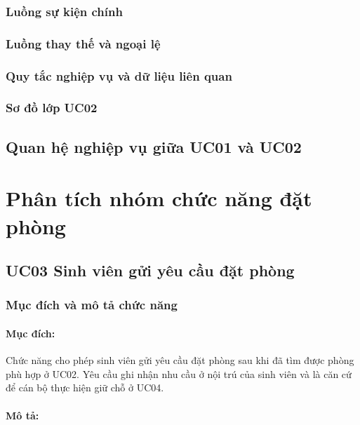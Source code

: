 \subsubsection{Luồng sự kiện chính}


\subsubsection{Luồng thay thế và ngoại lệ}


\subsubsection{Quy tắc nghiệp vụ và dữ liệu liên quan}


\subsubsection{Sơ đồ lớp UC02}


\subsection{Quan hệ nghiệp vụ giữa UC01 và UC02}


\section{Phân tích nhóm chức năng đặt phòng}

\subsection{UC03 Sinh viên gửi yêu cầu đặt phòng}

\subsubsection{Mục đích và mô tả chức năng}

\paragraph{Mục đích:}

Chức năng cho phép sinh viên gửi yêu cầu đặt phòng sau khi đã tìm được phòng phù hợp ở UC02. Yêu cầu ghi nhận nhu cầu ở nội trú của sinh viên và là căn cứ để cán bộ thực hiện giữ chỗ ở UC04.

\paragraph{Mô tả:}

